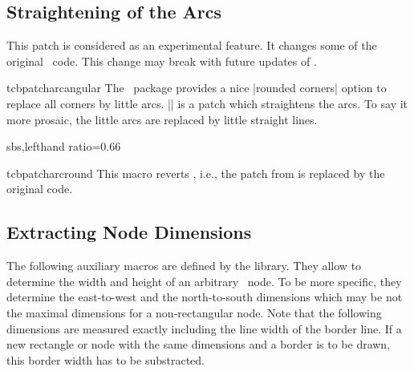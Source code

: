 \subsection{Straightening of the Arcs}

\begin{marker}
This patch is considered as an experimental feature.
It changes some of the original \tikzname\ code. This change may break
with future updates of \tikzname.
\end{marker}

\begin{docCommand}[doc new=2014-05-05]{tcbpatcharcangular}{}
The \tikzname\ package provides a nice |rounded corners| option to replace
all corners by little arcs. |\tcbpatcharcangular| is a patch which
straightens the arcs. To say it more prosaic, the little arcs are replaced
by little straight lines.

\begin{dispExample*}{sbs,lefthand ratio=0.66}
\end{dispExample*}

\end{docCommand}


\begin{docCommand}[doc new=2014-05-05]{tcbpatcharcround}{}
This macro reverts , i.e., the patch from
 is replaced by the original code.
\end{docCommand}


\clearpage
\subsection{Extracting Node Dimensions}
The following auxiliary macros are defined by the  library.
They allow to determine the width and height of an arbitrary \tikzname\ node.
To be more specific, they determine the east-to-west and the north-to-south dimensions
which may be not the maximal dimensions for a non-rectangular node.
Note that the following dimensions are measured exactly including the line width
of the border line. If a new rectangle or node with the same dimensions
and a border is to be drawn, this border width has to be substracted.

